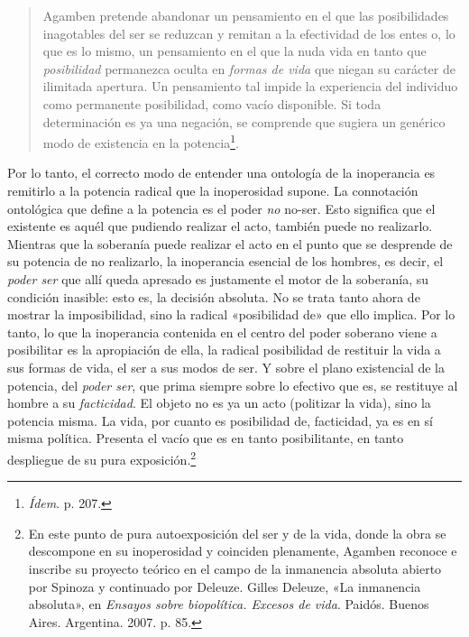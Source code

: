 \begin{quote}
Agamben pretende abandonar un pensamiento en el que las posibilidades inagotables del ser se reduzcan y remitan a la efectividad de los entes o, lo que es lo mismo, un pensamiento en el que la nuda vida en tanto que \emph{posibilidad} permanezca oculta en \emph{formas de vida} que niegan su carácter de ilimitada apertura. Un pensamiento tal impide la experiencia del individuo como permanente posibilidad, como vacío disponible. Si toda determinación es ya una negación, se comprende que sugiera un genérico modo de existencia en la potencia\footnote{\emph{Ídem}. p. 207.}.
\end{quote}

Por lo tanto, el correcto modo de entender una ontología de la inoperancia es remitirlo a la potencia radical que la inoperosidad supone. La connotación ontológica que define a la potencia es el poder \emph{no} no-ser. Esto significa que el existente es aquél que pudiendo realizar el acto, también puede no realizarlo. Mientras que la soberanía puede realizar el acto en el punto que se desprende de su potencia de no realizarlo, la inoperancia esencial de los hombres, es decir, el \emph{poder ser} que allí queda apresado es justamente el motor de la soberanía, su condición inasible: esto es, la decisión absoluta. No se trata tanto ahora de mostrar la imposibilidad, sino la radical «posibilidad de» que ello implica. Por lo tanto, lo que la inoperancia contenida en el centro del poder soberano viene a posibilitar es la apropiación de ella, la radical posibilidad de restituir la vida a sus formas de vida, el ser a sus modos de ser. Y sobre el plano existencial de la potencia, del \emph{poder ser}, que prima siempre sobre lo efectivo que es, se restituye al hombre a su \emph{facticidad}. El objeto no es ya un acto (politizar la vida), sino la potencia misma. La vida, por cuanto es posibilidad de, facticidad, ya es en sí misma política. Presenta el vacío que es en tanto posibilitante, en tanto despliegue de su pura exposición.\footnote{En este punto de pura autoexposición del ser y de la vida, donde la obra se descompone en su inoperosidad y coinciden plenamente, Agamben reconoce e inscribe su proyecto teórico en el campo de la inmanencia absoluta abierto por Spinoza y continuado por Deleuze. Gilles Deleuze, «La inmanencia absoluta», en \emph{Ensayos sobre biopolítica. Excesos de vida}. Paidós. Buenos Aires. Argentina. 2007. p. 85.}

